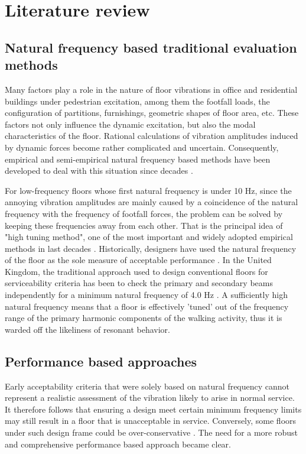 \chapter{Literature review}
\label{chap2}

\section{Natural frequency based traditional evaluation methods}
Many factors play a role in the nature of floor vibrations in office and residential buildings under pedestrian excitation, among them the footfall loads, the configuration of partitions, furnishings, geometric shapes of floor area, etc. These factors not only influence the dynamic excitation, but also the modal characteristics of the floor. Rational calculations of vibration amplitudes induced by dynamic forces become rather complicated and uncertain. Consequently, empirical and semi-empirical natural frequency based methods have been developed to deal with this situation since decades \cite{bachmann2012vibration}.

For low-frequency floors whose first natural frequency is under 10 Hz, since the annoying vibration amplitudes are mainly caused by a coincidence of the natural frequency with the frequency of footfall forces, the problem can be solved by keeping these frequencies away from each other. That is the principal idea of "high tuning method", one of the most important and widely adopted empirical methods in last decades \cite{bachmann2012vibration}. Historically, designers have used the natural frequency of the floor as the sole measure of acceptable performance \cite{european1992eurocode}. In the United Kingdom, the traditional approach used to design conventional floors for serviceability criteria has been to check the primary and secondary beams independently for a minimum natural frequency of 4.0 Hz \cite{smith2007design}. A sufficiently high natural frequency means that a floor is effectively 'tuned' out of the frequency range of the primary harmonic components of the walking activity, thus it is warded off the likeliness of resonant behavior. 

\section{Performance based approaches}
Early acceptability criteria that were solely based on natural frequency cannot represent a realistic assessment of the vibration likely to arise in normal service. It therefore follows that ensuring a design meet certain minimum frequency limits may still result in a floor that is unacceptable in service. Conversely, some floors under such design frame could be over-conservative \cite{smith2007design}. The need for a more robust and comprehensive performance based approach became clear.

